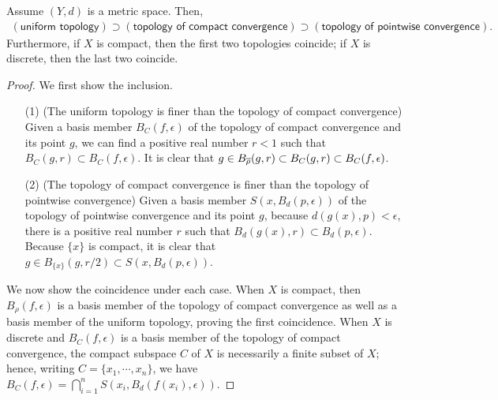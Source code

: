 \begin{thm}
    Assume $(Y, d)$ is a metric space.
    Then,
    \begin{align*}
        (\textsf{uniform topology})\supset(\textsf{topology of compact convergence})\supset(\textsf{topology of pointwise convergence}).
    \end{align*}
    Furthermore, if $X$ is compact, then the first two topologies coincide; if $X$ is discrete, then the last two coincide.
\end{thm}
\begin{proof}
    We first show the inclusion.
    \begin{enumerate}
        \item[(1)]
        {
            (The uniform topology is finer than the topology of compact convergence)
            Given a basis member $B_C(f, \epsilon)$ of the topology of compact convergence and its point $g$, we can find a positive real number $r<1$ such that $B_C(g, r)\subset B_C(f, \epsilon)$.
            It is clear that $g\in B_{\overline{\rho}}(g, r)\subset B_C(g, r)\subset B_C(f, \epsilon)$.
        }
        \item[(2)]
        {
            (The topology of compact convergence is finer than the topology of pointwise convergence)
            Given a basis member $S(x, B_d(p, \epsilon))$ of the topology of pointwise convergence and its point $g$, because $d(g(x), p)<\epsilon$, there is a positive real number $r$ such that $B_d(g(x), r)\subset B_d(p, \epsilon)$.
            Because $\{x\}$ is compact, it is clear that $g\in B_{\{x\}}(g, r/2)\subset S(x, B_d(p, \epsilon))$.
        }
    \end{enumerate}

    We now show the coincidence under each case.
    When $X$ is compact, then $B_\rho(f, \epsilon)$ is a basis member of the topology of compact convergence as well as a basis member of the uniform topology, proving the first coincidence.
    When $X$ is discrete and $B_C(f, \epsilon)$ is a basis member of the topology of compact convergence, the compact subspace $C$ of $X$ is necessarily a finite subset of $X$; hence, writing $C=\{x_1, \cdots, x_n\}$, we have $B_C(f, \epsilon)=\bigcap_{i=1}^n S(x_i, B_d(f(x_i), \epsilon))$.
\end{proof}


